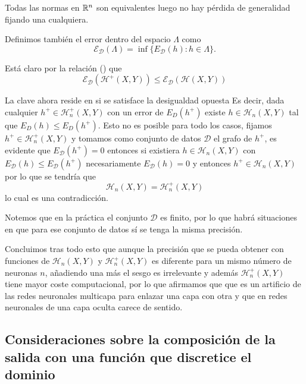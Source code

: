  Todas las normas en $\mathbb{R}^n$ son equivalentes luego no hay pérdida de generalidad fijando una cualquiera.  

 Definimos también el error dentro del espacio $\Lambda$ como 
 \begin{equation}
    \mathcal{E}_{\mathcal{D}} (\Lambda)
    = \inf \{ E_{\mathcal{D}}(h) : h \in \Lambda\}.
 \end{equation}

Está claro por la relación  
 ()
 que 
 \begin{equation}
    \mathcal{E}_{\mathcal{D}}(\mathcal{H}^+(X,Y))
    \leq
    \mathcal{E}_{\mathcal{D}}(\mathcal{H}(X,Y))
 \end{equation}

 La clave ahora reside en si se satisface la desigualdad opuesta
Es decir, dada cualquier $h^+ \in \mathcal{H}^+_n(X,Y)$ con un error de $E_D(h^+)$ existe $h \in \mathcal{H}_n(X,Y)$  tal que $E_D(h) \leq E_D(h^+).$  
Esto no es posible para todo los casos, fijamos $h^+ \in \mathcal{H}^+_n(X,Y)$ y tomamos como conjunto de datos $\mathcal{D}$ el grafo de $h^+$, es evidente que $E_{\mathcal{D}}(h^+) = 0$ entonces si existiera $h \in \mathcal{H}_n(X,Y)$ con $E_{\mathcal{D}}(h) \leq E_{\mathcal{D}}(h^+)$ necesariamente $E_{\mathcal{D}}(h) = 0$ y entonces $h^+ \in \mathcal{H}_n(X,Y)$ por lo que se tendría que 
$$\mathcal{H}_n(X,Y) = \mathcal{H}_n^+(X,Y)$$ 
lo cual es una contradicción.

Notemos que en la práctica el conjunto $\mathcal{D}$ es finito, 
por lo que habrá situaciones en que para ese conjunto de datos sí  se tenga la misma precisión. 


 Concluimos tras todo esto que aunque la precisión que se pueda obtener con funciones de $\mathcal{H}_n(X,Y)$ y $\mathcal{H}^+_n(X,Y)$ es diferente para un mismo número de neuronas $n$, añadiendo una más el sesgo es irrelevante  y además $\mathcal{H}^+_n(X,Y)$ tiene mayor coste computacional, por lo que afirmamos que 
que es un artificio de las redes neuronales multicapa para enlazar una capa con otra y que en redes neuronales de una capa oculta carece de sentido.


\subsection{Consideraciones sobre la composición de la salida con una función que discretice el dominio}

